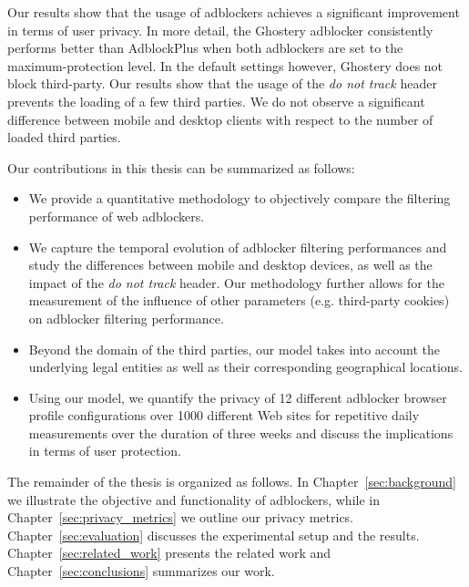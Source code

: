 Our results show that the usage of adblockers achieves a significant improvement in terms of user privacy. In more detail, the Ghostery adblocker consistently performs better than AdblockPlus when both adblockers are set to the maximum-protection level. In the default settings however, Ghostery does not block third-party. Our results show that the usage of the \textit{do not track} header prevents the loading of a few third parties. We do not observe a significant difference between mobile and desktop clients with respect to the number of loaded third parties.

Our contributions in this thesis can be summarized as follows:
 \begin{itemize}
 \item We provide a quantitative methodology to objectively compare the filtering performance of web adblockers.
 \item We capture the temporal evolution of adblocker filtering performances and study the differences between mobile and desktop devices, as well as the impact of the \emph{do not track} header. Our methodology further allows for the measurement of the influence of other parameters (e.g. third-party cookies) on adblocker filtering performance.
 \item Beyond the domain of the third parties, our model takes into account the underlying legal entities as well as their corresponding geographical locations.
 \item Using our model, we quantify the privacy of 12 different adblocker browser profile configurations over 1000 different Web sites for repetitive daily measurements over the duration of three weeks and discuss the implications in terms of user protection.
\end{itemize}

The remainder of the thesis is organized as follows. In Chapter~\ref{sec:background} we illustrate the objective and functionality of adblockers, while in Chapter~\ref{sec:privacy_metrics} we outline our privacy metrics. Chapter~\ref{sec:evaluation} discusses the experimental setup and the results. Chapter~\ref{sec:related_work} presents the related work and Chapter~\ref{sec:conclusions} summarizes our work.
